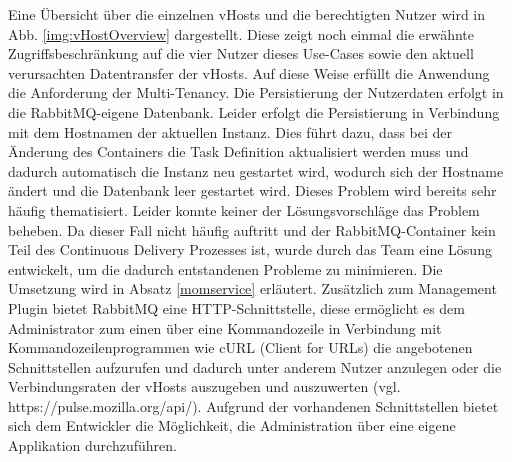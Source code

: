 Eine Übersicht über die einzelnen vHosts und die berechtigten Nutzer wird in Abb. \ref{img:vHostOverview} dargestellt. Diese zeigt noch einmal die erwähnte Zugriffsbeschränkung auf die vier Nutzer dieses Use-Cases sowie den aktuell verursachten Datentransfer der vHosts. Auf diese Weise erfüllt die Anwendung die Anforderung der Multi-Tenancy. Die Persistierung der Nutzerdaten erfolgt in die RabbitMQ-eigene Datenbank. Leider erfolgt die Persistierung in Verbindung mit dem Hostnamen der aktuellen Instanz. Dies führt dazu, dass bei der Änderung des Containers die Task Definition aktualisiert werden muss und dadurch automatisch die Instanz neu gestartet wird, wodurch sich der Hostname ändert und die Datenbank leer gestartet wird. Dieses Problem wird bereits sehr häufig thematisiert. Leider konnte keiner der Lösungsvorschläge das Problem beheben. Da dieser Fall nicht häufig auftritt und der RabbitMQ-Container kein Teil des Continuous Delivery Prozesses ist, wurde durch das Team eine Lösung entwickelt, um die dadurch entstandenen Probleme zu minimieren. Die Umsetzung wird in Absatz \ref{momservice} erläutert. Zusätzlich zum Management Plugin bietet RabbitMQ eine HTTP-Schnittstelle, diese ermöglicht es dem Administrator zum einen über eine Kommandozeile in Verbindung mit Kommandozeilenprogrammen wie cURL (Client for URLs) die angebotenen Schnittstellen aufzurufen und dadurch unter anderem Nutzer anzulegen oder die Verbindungsraten der vHosts auszugeben und auszuwerten (vgl. https://pulse.mozilla.org/api/). Aufgrund der vorhandenen Schnittstellen bietet sich dem Entwickler die Möglichkeit, die Administration über eine eigene Applikation durchzuführen. 
\clearpage
